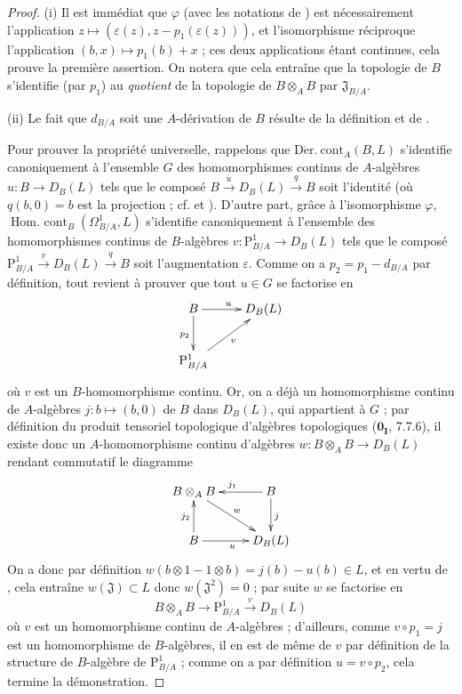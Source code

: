 \begin{proof}
(i) Il est immédiat que $\varphi$ (avec les notations de
) est nécessairement l'application
$z\mapsto(\varepsilon(z),z-p_1(\varepsilon(z)))$, et l'isomorphisme
réciproque l'application $(b,x)\mapsto p_1(b)+x$ ; ces deux applications
étant continues, cela prouve la première assertion. On notera que cela
entraîne que la topologie de $B$ s'identifie (par $p_1$) au \emph{quotient}
de la topologie de $B\otimes_A B$ par $\mathfrak{J}_{B/A}$.

(ii) Le fait que $d_{B/A}$ soit une $A$-dérivation de $B$ résulte de la
définition  et de .

Pour prouver la propriété universelle, rappelons que
$\operatorname{D\acute{e}r.\ cont}_A(B,L)$ s'identifie canoniquement à
l'ensemble $G$ des homomorphismes continus de $A$-algèbres
$u:B\to D_B(L)$ tels que le composé
$B\xrightarrow{u}D_B(L)\xrightarrow{q}B$ soit l'identité (où $q(b,0)=b$ est
la projection ; cf.  et ). D'autre part,
grâce à l'isomorphisme $\varphi$,
$\operatorname{Hom.\ cont}_B(\Omega^1_{B/A},L)$ s'identifie canoniquement à
l'ensemble des homomorphismes continus de $B$-algèbres
$v:\mathrm{P}^1_{B/A}\to D_B(L)$ tels que le composé
$\mathrm{P}^1_{B/A}\xrightarrow{v}D_B(L)\xrightarrow{q}B$ soit
l'augmentation $\varepsilon$. Comme on a $p_2=p_1-d_{B/A}$ par définition,
tout revient à prouver que tout $u\in G$ se factorise en
\[
\xymatrix{
  B \ar[r]^u \ar[d]_{p_2} & D_B(L) \\
  \mathrm{P}^1_{B/A} \ar[ur]_v &
}
\]
où $v$ est un $B$-homomorphisme continu. Or, on a déjà un homomorphisme
continu de $A$-algèbres $j:b\mapsto(b,0)$ de $B$ dans $D_B(L)$, qui
appartient à $G$ ; par définition du produit tensoriel topologique
d'algèbres topologiques ($\mathbf{0_I}$, 7.7.6), il existe donc un
$A$-homomorphisme continu d'algèbres
$w:B\otimes_A B\to D_B(L)$ rendant commutatif le diagramme
\[
\xymatrix{
  B\otimes_A B \ar[dr]^w & B \ar[l]_{j_1} \ar[d]^j \\
  B \ar[u]^{j_2} \ar[r]_u & D_B(L)
}
\]
On a donc par définition
$w(b\otimes1-1\otimes b)=j(b)-u(b)\in L$, et en vertu de
, cela entraîne $w(\mathfrak{J})\subset L$ donc
$w(\mathfrak{J}^2)=0$ ; par suite $w$ se factorise en
\[
  B\otimes_A B\to\mathrm{P}^1_{B/A}\xrightarrow{v}D_B(L)
\]
où $v$ est un homomorphisme continu de $A$-algèbres ; d'ailleurs, comme
$v\circ p_1=j$ est un homomorphisme de $B$-algèbres, il en est de même de
$v$ par définition de la structure de $B$-algèbre de
$\mathrm{P}^1_{B/A}$ ; comme on a par définition $u=v\circ p_2$, cela
termine la démonstration.
\end{proof}

